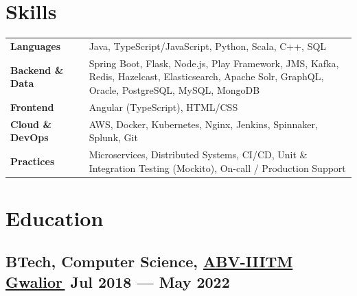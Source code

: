 \documentclass[a4paper,10pt]{article}
\let\orighref\href
\renewcommand{\href}[2]{\orighref{#1}{#2\,\faExternalLink}}
\newcommand{\hskills}[1]{
\textbf{\bfseries #1} }
\begin{document}
\section{Skills}
\begin{tabular}{p{11em} p{1em} p{43em}}
\hskills{Languages} &  & Java, TypeScript/JavaScript, Python, Scala, C++, SQL \\
\hskills{Backend \& Data} &  & Spring Boot, Flask, Node.js, Play Framework, JMS, Kafka, Redis, Hazelcast, Elasticsearch, Apache Solr, GraphQL, Oracle, PostgreSQL, MySQL, MongoDB \\
\hskills{Frontend} &  & Angular (TypeScript), HTML/CSS \\
\hskills{Cloud \& DevOps} &  & AWS, Docker, Kubernetes, Nginx, Jenkins, Spinnaker, Splunk, Git \\
\hskills{Practices} &  & Microservices, Distributed Systems, CI/CD, Unit \& Integration Testing (Mockito), On-call / Production Support \\
\end{tabular}
\vspace{-0.2cm}

\section{Education}
\subsection*{BTech, Computer Science, {\normalsize \normalfont \href{https://iiitm.ac.in/index.php/en/}{ABV-IIITM Gwalior}} \hfill Jul 2018 --- May 2022}

\end{document}
